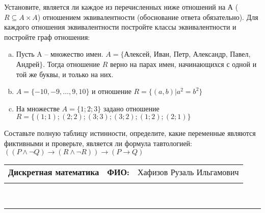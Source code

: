 \documentclass[10pt]{exam}
\newcommand{\class}{Дискретная математика}
\newcommand{\examdate}{}
\begin{document}
\begin{questions}
\question
Установите, является ли каждое из перечисленных ниже отношений на А ($R \subseteq A \times A$) отношением эквивалентности (обоснование ответа обязательно). Для каждого отношения эквивалентности постройте классы 
эквивалентности и постройте граф отношения:
\begin{enumerate} [a)]\setcounter{enumi}{0}
\item Пусть A – множество имен. $A = \{ $Алексей, Иван, Петр, Александр, Павел, Андрей$ \}$. Тогда отношение $R$ верно на парах имен, начинающихся с одной и той же буквы, и только на них.
\item $A = \{-10, -9, … , 9, 10\}$ и отношение $ R = \{(a,b)|a^{2} = b^{2}\}$
\item На множестве $A = \{1; 2; 3\}$ задано отношение $R = \{(1; 1); (2; 2); (3; 3); (3; 2); (1; 2); (2; 1)\}$
\end{enumerate}\question Составьте полную таблицу истинности, определите, какие переменные являются фиктивными и проверьте, является ли формула тавтологией:
$(( P \land \neg Q) \rightarrow (R \land \neg R)) \rightarrow (P \rightarrow Q)$

\end{questions}
\newpage
\begin{flushright}
\begin{tabular}{p{2.8in} r l}
\textbf{\class} & \textbf{ФИО:} &Хафизов Рузаль Ильгамович
\\

\textbf{\examdate} &&\\
\end{tabular}\\
\end{flushright}
\rule[1ex]{\textwidth}{.1pt}
\end{document}
